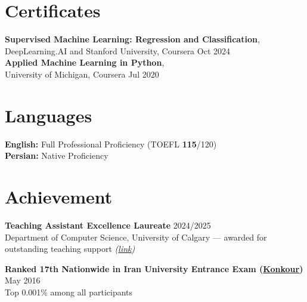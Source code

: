 \documentclass[a4paper,10pt]{article}
\begin{document}
\section*{Certificates}

\textbf{Supervised Machine Learning: Regression and Classification},\\
DeepLearning.AI and Stanford University, Coursera 
\hfill Oct 2024 \\
\textbf{Applied Machine Learning in Python},\\
University of Michigan, Coursera 
\hfill Jul 2020


\section*{Languages}

\textbf{English:} Full Professional Proficiency (TOEFL \textbf{115}/120) \\
\textbf{Persian:} Native Proficiency

\section*{Achievement}

\textbf{Teaching Assistant Excellence Laureate} \hfill 2024/2025 \\
Department of Computer Science, University of Calgary --- awarded for outstanding teaching support \textit{(\href{https://science.ucalgary.ca/computer-science/about/our-department/ta-recognition-2024-2025}{link})}

\vspace{0.35em}

\textbf{Ranked 17th Nationwide in Iran University Entrance Exam (\href{https://en.wikipedia.org/wiki/Iranian_University_Entrance_Exam}{Konkour})} \hfill May 2016 \\
Top 0.001\% among all participants
\end{document}
